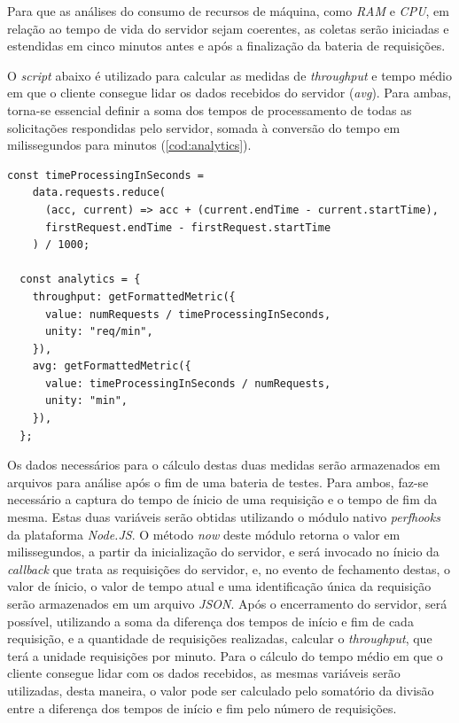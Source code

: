 \documentclass[12pt]{article}
\begin{document}
Para que as análises do consumo de recursos de máquina, como \textit{RAM} e \textit{CPU}, em relação
ao tempo de vida do servidor sejam coerentes, as coletas serão iniciadas e estendidas em cinco 
minutos antes e após a finalização da bateria de requisições.

O \textit{script} abaixo é utilizado para calcular as medidas de \textit{throughput} e 
tempo médio em que o cliente consegue lidar os dados recebidos do servidor (\textit{avg}). Para ambas, torna-se essencial definir a soma dos tempos de processamento de
todas as solicitações respondidas pelo servidor, somada à conversão do tempo em milissegundos para minutos (\autoref{cod:analytics}).

\begin{lstlisting}[caption={Implementação do cálculo das medidas de \textit{throughput} e tempo médio em que o cliente consegue lidar com os dados recebidos}, label=cod:analytics]
	const timeProcessingInSeconds =
    data.requests.reduce(
      (acc, current) => acc + (current.endTime - current.startTime),
      firstRequest.endTime - firstRequest.startTime
    ) / 1000;

  const analytics = {
    throughput: getFormattedMetric({
      value: numRequests / timeProcessingInSeconds,
      unity: "req/min",
    }),
    avg: getFormattedMetric({
      value: timeProcessingInSeconds / numRequests,
      unity: "min",
    }),
  };
\end{lstlisting}

Os dados necessários para o cálculo destas duas medidas serão armazenados em arquivos para análise após o fim de uma 
bateria de testes. Para ambos, faz-se necessário a captura do tempo de ínicio de uma requisição
e o tempo de fim da mesma. Estas duas variáveis serão obtidas utilizando
o módulo nativo \textit{perf\textunderscore hooks} da plataforma \textit{Node.JS}. 
O método \textit{now} deste módulo retorna o valor em milissegundos, a partir da inicialização
do servidor, e será invocado no ínicio da 
\textit{callback} que trata as requisições do servidor, e, no evento de 
fechamento destas, o valor de ínicio, o valor de tempo atual e
uma identificação única da requisição serão armazenados em um arquivo \textit{JSON}. Após o encerramento do servidor, será 
possível, utilizando a soma da diferença dos tempos de início e fim de cada requisição, e a quantidade de requisições realizadas, calcular o 
\textit{throughput}, que terá a unidade requisições por minuto. Para o cálculo do tempo médio em que o cliente consegue lidar com os dados recebidos, 
as mesmas variáveis serão utilizadas, desta maneira, o valor pode ser calculado pelo somatório da 
divisão entre a diferença dos tempos de início e fim pelo número de requisições.
\end{document}

